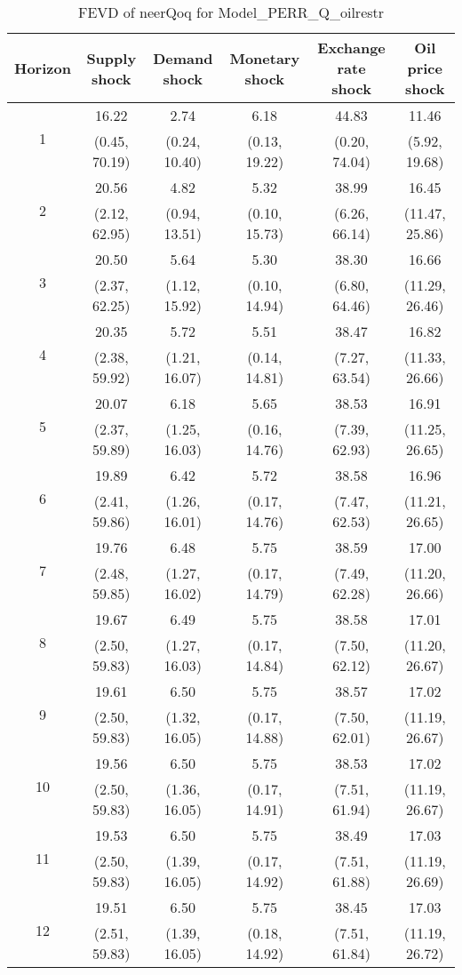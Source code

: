 \documentclass{article}
\begin{document}
\begin{table}
	\footnotesize
	\caption{FEVD of neerQoq for Model_PERR_Q_oilrestr}
	\begin{tabular}{cccccc}
		Horizon & Supply shock & Demand shock & Monetary shock & Exchange rate shock & Oil price shock\\ \hline
		\multirow{2}{*}{1} & 16.22 & 2.74 & 6.18 & 44.83 & 11.46\\
		 & (0.45, 70.19) & (0.24, 10.40) & (0.13, 19.22) & (0.20, 74.04) & (5.92, 19.68)\\
		\multirow{2}{*}{2} & 20.56 & 4.82 & 5.32 & 38.99 & 16.45\\
		 & (2.12, 62.95) & (0.94, 13.51) & (0.10, 15.73) & (6.26, 66.14) & (11.47, 25.86)\\
		\multirow{2}{*}{3} & 20.50 & 5.64 & 5.30 & 38.30 & 16.66\\
		 & (2.37, 62.25) & (1.12, 15.92) & (0.10, 14.94) & (6.80, 64.46) & (11.29, 26.46)\\
		\multirow{2}{*}{4} & 20.35 & 5.72 & 5.51 & 38.47 & 16.82\\
		 & (2.38, 59.92) & (1.21, 16.07) & (0.14, 14.81) & (7.27, 63.54) & (11.33, 26.66)\\
		\multirow{2}{*}{5} & 20.07 & 6.18 & 5.65 & 38.53 & 16.91\\
		 & (2.37, 59.89) & (1.25, 16.03) & (0.16, 14.76) & (7.39, 62.93) & (11.25, 26.65)\\
		\multirow{2}{*}{6} & 19.89 & 6.42 & 5.72 & 38.58 & 16.96\\
		 & (2.41, 59.86) & (1.26, 16.01) & (0.17, 14.76) & (7.47, 62.53) & (11.21, 26.65)\\
		\multirow{2}{*}{7} & 19.76 & 6.48 & 5.75 & 38.59 & 17.00\\
		 & (2.48, 59.85) & (1.27, 16.02) & (0.17, 14.79) & (7.49, 62.28) & (11.20, 26.66)\\
		\multirow{2}{*}{8} & 19.67 & 6.49 & 5.75 & 38.58 & 17.01\\
		 & (2.50, 59.83) & (1.27, 16.03) & (0.17, 14.84) & (7.50, 62.12) & (11.20, 26.67)\\
		\multirow{2}{*}{9} & 19.61 & 6.50 & 5.75 & 38.57 & 17.02\\
		 & (2.50, 59.83) & (1.32, 16.05) & (0.17, 14.88) & (7.50, 62.01) & (11.19, 26.67)\\
		\multirow{2}{*}{10} & 19.56 & 6.50 & 5.75 & 38.53 & 17.02\\
		 & (2.50, 59.83) & (1.36, 16.05) & (0.17, 14.91) & (7.51, 61.94) & (11.19, 26.67)\\
		\multirow{2}{*}{11} & 19.53 & 6.50 & 5.75 & 38.49 & 17.03\\
		 & (2.50, 59.83) & (1.39, 16.05) & (0.17, 14.92) & (7.51, 61.88) & (11.19, 26.69)\\
		\multirow{2}{*}{12} & 19.51 & 6.50 & 5.75 & 38.45 & 17.03\\
		 & (2.51, 59.83) & (1.39, 16.05) & (0.18, 14.92) & (7.51, 61.84) & (11.19, 26.72)\\
	\end{tabular}
\label{tab:fevd-Model_PERR_Q_oilrestr-neerQoq}
\end{table}
\end{document}
